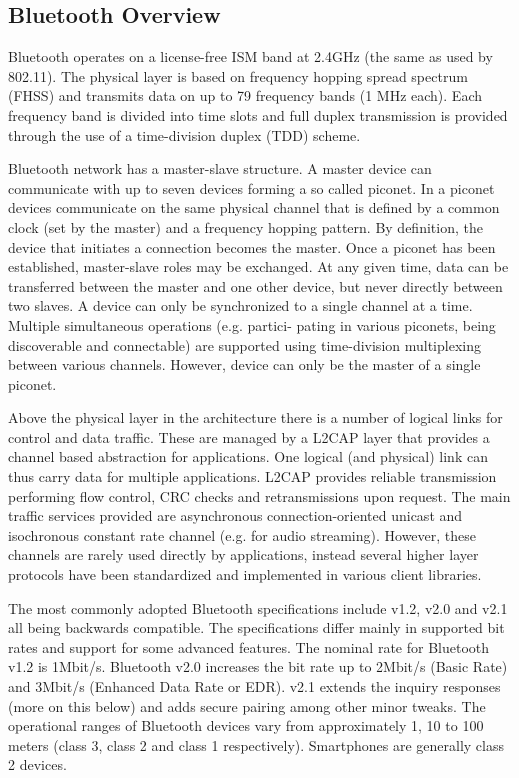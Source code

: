 \subsection{Bluetooth Overview}

Bluetooth operates on a license-free ISM band at 2.4GHz (the same as used by 802.11). The physical layer is based on frequency hopping spread spectrum (FHSS) and transmits data on up to 79 frequency bands (1 MHz each). Each frequency band is divided into time slots and full duplex transmission is provided through the use of a time-division duplex (TDD) scheme.

Bluetooth network has a master-slave structure. A master device can communicate with up to seven devices forming a so called piconet. In a piconet devices communicate on the same physical channel that is defined by a common clock (set by the master) and a frequency hopping pattern. By definition, the device that initiates a connection becomes the master. Once a piconet has been established, master-slave roles may be exchanged. At any given time, data can be transferred between the master and one other device, but never directly between two slaves. A device can only be synchronized to a single channel at a time. Multiple simultaneous operations (e.g. partici-
pating in various piconets, being discoverable and connectable) are supported using time-division multiplexing between various channels. However, device can only be the master of a single piconet.

Above the physical layer in the architecture there is a number of logical links for control and data traffic. These are managed by a L2CAP layer that provides a channel based abstraction for applications. One logical (and physical) link can thus carry data for multiple applications. L2CAP provides reliable transmission performing flow control, CRC checks and retransmissions upon request. The main traffic services provided are asynchronous connection-oriented unicast and isochronous constant rate channel (e.g. for audio streaming). However, these channels are rarely used directly by applications, instead several higher layer protocols have been standardized and implemented in various client libraries. 

The most commonly adopted Bluetooth specifications include v1.2, v2.0 and v2.1 all being backwards compatible. The specifications differ mainly in supported bit rates and support for some advanced features. The nominal rate for Bluetooth v1.2 is 1Mbit/s. Bluetooth v2.0 increases the bit rate up to 2Mbit/s (Basic Rate) and 3Mbit/s (Enhanced Data Rate or EDR). v2.1 extends the inquiry responses (more on this below) and adds secure pairing among other minor tweaks. The operational ranges of Bluetooth devices vary from approximately 1, 10 to 100 meters (class 3, class 2 and class 1 respectively). Smartphones are generally class 2 devices.

